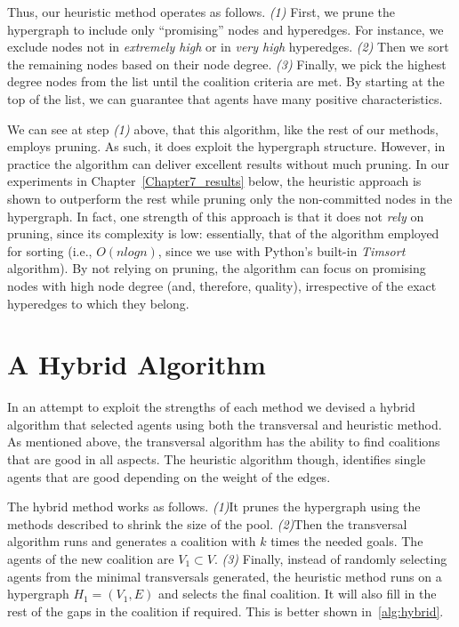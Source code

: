 Thus, our heuristic method operates as follows. {\em (1)} First, we prune the hypergraph to include only ``promising'' nodes and hyperedges. For instance, we exclude nodes not in {\em extremely high} or in {\em very high} hyperedges. {\em (2)} Then we sort the remaining nodes based on their node degree. {\em (3)}  Finally, we pick the highest degree nodes from the list until the coalition criteria are met. By starting at the top of the list, we can guarantee that agents have many positive characteristics. 

We can see at step {\em (1)} above, that this algorithm, like the rest of our methods, employs pruning. As such, it does exploit the hypergraph structure. However, in practice the algorithm can deliver excellent results without much pruning. In our experiments in Chapter~\ref{Chapter7_results} below, the heuristic approach is shown to outperform the rest while pruning only the non-committed nodes in the hypergraph. In fact, one strength of this approach is that it does not {\em rely} on pruning, since its complexity is low: essentially, that of the algorithm employed for sorting (i.e., $O(nlogn)$, since we use with Python's built-in {\em Timsort} algorithm). By not relying on pruning, the algorithm can focus on promising nodes with high node degree (and, therefore, quality), irrespective of the exact hyperedges to which they belong.

\section{A Hybrid Algorithm} \label{sec:hybrid}

In an attempt to exploit the strengths of each method we devised a hybrid algorithm that selected agents using both the transversal and heuristic method. As mentioned above, the transversal algorithm has the ability to find coalitions that are good in all aspects. The heuristic algorithm though, identifies single agents that are good depending on the weight of the edges.

The hybrid method works as follows. {\em (1)}It prunes the hypergraph using the methods described to shrink the size of the pool. {\em (2)}Then the transversal algorithm runs and generates a coalition with $k$ times the needed goals. The agents of the new coalition are $V_1 \subset V$.  {\em (3)} Finally, instead of randomly selecting agents from the minimal transversals generated, the heuristic method runs on a hypergraph $H_1 = (V_1, E)$ and selects the final coalition. It will also fill in the rest of the gaps in the coalition  if required. This is better shown in~\ref{alg:hybrid}.

